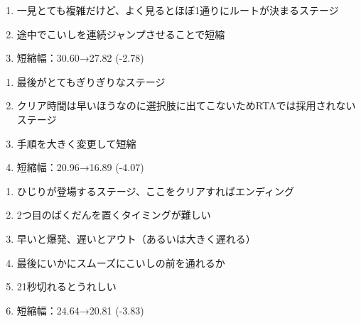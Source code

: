 \begin{enumerate}[label={\sarrow}]
\item 一見とても複雑だけど、よく見るとほぼ1通りにルートが決まるステージ
\item 途中でこいしを連続ジャンプさせることで短縮
\item 短縮幅：30.60→27.82 (-2.78)
\end{enumerate}



\begin{enumerate}[label={\sarrow}]
\item 最後がとてもぎりぎりなステージ
\item クリア時間は早いほうなのに選択肢に出てこないためRTAでは採用されないステージ
\item 手順を大きく変更して短縮
\item 短縮幅：20.96→16.89 (-4.07)
\end{enumerate}



\begin{enumerate}[label={\sarrow}]
\item ひじりが登場するステージ、ここをクリアすればエンディング
\item 2つ目のばくだんを置くタイミングが難しい
\item 早いと爆発、遅いとアウト（あるいは大きく遅れる）
\item 最後にいかにスムーズにこいしの前を通れるか
\item 21秒切れるとうれしい
\item 短縮幅：24.64→20.81 (-3.83)
\end{enumerate}




\begin{appendices}
\end{appendices}

